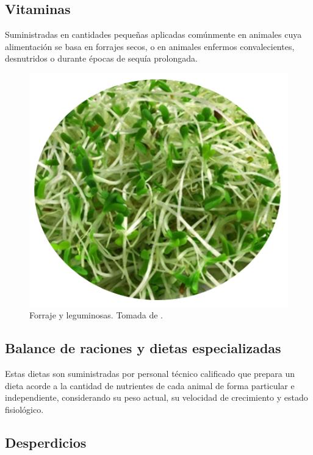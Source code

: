 \subsection{Vitaminas}
Suministradas en cantidades pequeñas aplicadas comúnmente en animales cuya alimentación se basa en forrajes secos,  o en animales enfermos convalecientes, desnutridos o durante épocas de sequía prolongada.
	\begin{figure}[H]
	 \begin{center}
	 \includegraphics[scale=0.6]{img/leguminosas.png}
	 \end{center}
	 \caption{Forraje y leguminosas. Tomada de \cite{librito1}. \label{vitaminaspng}}
	\end{figure}

\subsection{Balance de raciones y dietas especializadas}
    Estas dietas son suministradas por personal técnico calificado que prepara un dieta acorde a la cantidad de nutrientes de cada animal de forma particular e independiente, considerando su peso actual, su velocidad de crecimiento y estado fisiológico.

\subsection{Desperdicios}

